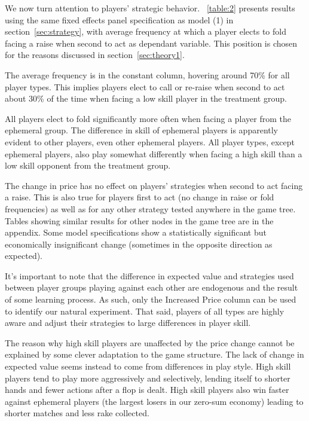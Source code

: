 \documentclass[12pt]{article}
\begin{document}
We now turn attention to players’ strategic behavior. ~\ref{table:2} presents results using the same fixed effects panel specification as model (1) in section~\ref{sec:strategy}, with average frequency at which a player elects to fold facing a raise when second to act as dependant variable. This position is chosen for the reasons discussed in section~\ref{sec:theory1}.

The average frequency is in the constant column, hovering around 70\% for all player types. This implies players elect to call or re-raise when second to act about 30\% of the time when facing a low skill player in the treatment group.

All players elect to fold significantly more often when facing a player from the ephemeral group. The difference in skill of ephemeral players is apparently evident to other players, even other ephemeral players. All player types, except ephemeral players, also play somewhat differently when facing a high skill than a low skill opponent from the treatment group.

The change in price has no effect on players’ strategies when second to act facing a raise. This is also true for players first to act (no change in raise or fold frequencies) as well as for any other strategy tested anywhere in the game tree. Tables showing similar results for other nodes in the game tree are in the appendix. Some model specifications show a statistically significant but economically insignificant change (sometimes in the opposite direction as expected).

It’s important to note that the difference in expected value and strategies used between player groups playing against each other are endogenous and the result of some learning process. As such, only the Increased Price column can be used to identify our natural experiment. That said, players of all types are highly aware and adjust their strategies to large differences in player skill. 

The reason why high skill players are unaffected by the price change cannot be explained by some clever adaptation to the game structure. The lack of change in expected value seems instead to come from differences in play style. High skill players tend to play more aggressively and selectively, lending itself to shorter hands and fewer actions after a flop is dealt. High skill players also win faster against ephemeral players (the largest losers in our zero-sum economy) leading to shorter matches and less rake collected.
\end{document}

